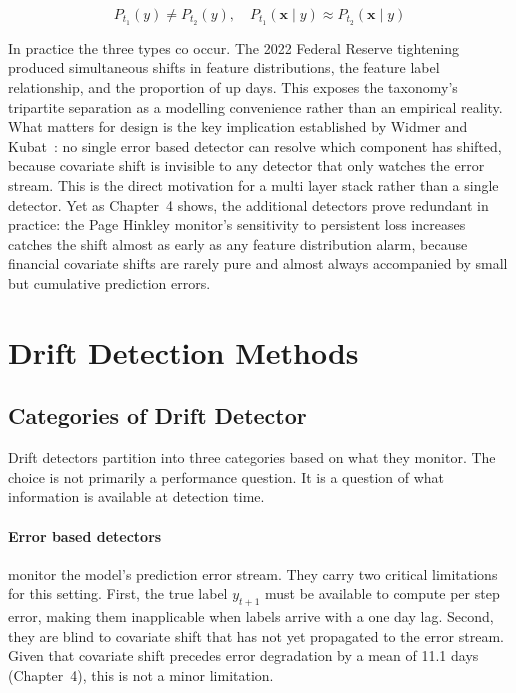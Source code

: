 \begin{equation}
  P_{t_1}(y) \neq P_{t_2}(y), \quad
  P_{t_1}(\mathbf{x} \mid y) \approx P_{t_2}(\mathbf{x} \mid y)
  \label{eq:label_shift}
\end{equation}

In practice the three types co occur. The 2022 Federal Reserve tightening produced simultaneous shifts in feature distributions, the feature label relationship, and the proportion of up days. This exposes the taxonomy's tripartite separation as a modelling convenience rather than an empirical reality. What matters for design is the key implication established by Widmer and Kubat~\cite{widmer1996}: no single error based detector can resolve which component has shifted, because covariate shift is invisible to any detector that only watches the error stream. This is the direct motivation for a multi layer stack rather than a single detector. Yet as Chapter~4 shows, the additional detectors prove redundant in practice: the Page Hinkley monitor's sensitivity to persistent loss increases catches the shift almost as early as any feature distribution alarm, because financial covariate shifts are rarely pure and almost always accompanied by small but cumulative prediction errors.

\section{Drift Detection Methods}
\label{sec:detection_methods}

\subsection{Categories of Drift Detector}

Drift detectors partition into three categories based on what they monitor. The choice is not primarily a performance question. It is a question of what information is available at detection time.

\paragraph{Error based detectors} monitor the model's prediction error stream. They carry two critical limitations for this setting. First, the true label $y_{t+1}$ must be available to compute per step error, making them inapplicable when labels arrive with a one day lag. Second, they are blind to covariate shift that has not yet propagated to the error stream. Given that covariate shift precedes error degradation by a mean of 11.1 days (Chapter~4), this is not a minor limitation.

